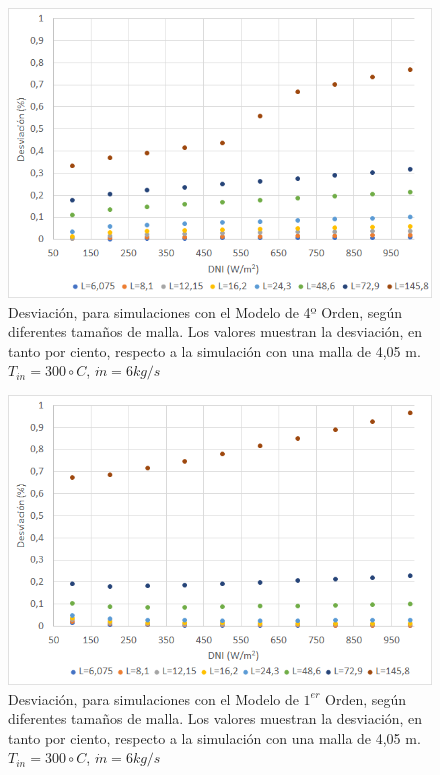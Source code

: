 \begin{figure}[h!]
\includegraphics[width=0.9\linewidth]{images/desviacionmodel4malla.png}
\caption{Desviación, para simulaciones con el Modelo de 4º Orden, según diferentes tamaños de malla. Los valores muestran la desviación, en tanto por ciento, respecto a la simulación con una malla de 4,05 m. $T_{in}=300 \circ C$, $\dot m = 6 kg/s$} 
\label{fig:desviacionmodel4}
\end{figure}

\begin{figure}[h!]
\includegraphics[width=0.9\linewidth]{images/desviacionmodel1malla.png}
\caption{Desviación, para simulaciones con el Modelo de $1^{er}$ Orden, según diferentes tamaños de malla. Los valores muestran la desviación, en tanto por ciento, respecto a la simulación con una malla de 4,05 m. $T_{in}=300 \circ C$, $\dot m = 6 kg/s$} 
\label{fig:desviacionmodel1}
\end{figure}

